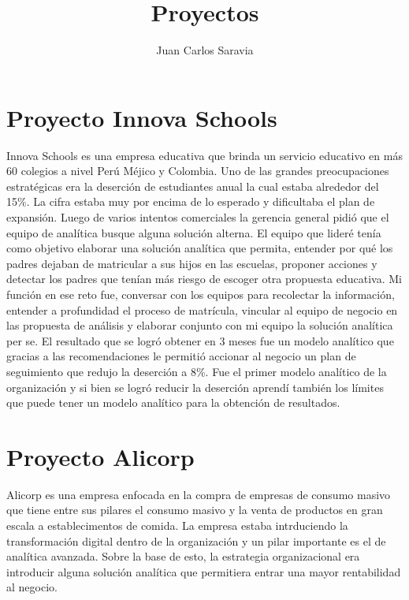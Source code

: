 \documentclass{article}
\date{}%
\begin{document}
\title{Proyectos} \author{Juan Carlos Saravia}

\maketitle

\section*{Proyecto Innova Schools}

Innova Schools es una empresa educativa que brinda un servicio educativo en más 60 colegios a nivel Perú Méjico y Colombia. Uno de las grandes preocupaciones estratégicas era la deserción de estudiantes anual la cual estaba alrededor del 15\%. La cifra estaba muy por encima de lo esperado y dificultaba el plan de expansión. Luego de varios intentos comerciales la gerencia general pidió que el equipo de analítica busque alguna solución alterna. El equipo que lideré tenía como objetivo elaborar una solución analítica que permita, entender por qué los padres dejaban de matricular a sus hijos en las escuelas, proponer acciones y detectar los padres que tenían más riesgo de escoger otra propuesta educativa. Mi función en ese reto fue, conversar con los equipos para recolectar la información, entender a profundidad el proceso de matrícula, vincular al equipo de negocio en las propuesta de análisis y elaborar conjunto con mi equipo la solución analítica per se. El resultado que se logró obtener en 3 meses fue un modelo analítico que gracias a las recomendaciones le permitió accionar al negocio un plan de seguimiento que redujo la deserción a 8\%. Fue el primer modelo analítico de la organización y si bien se logró reducir la deserción aprendí también los límites que puede tener un modelo analítico para la obtención de resultados. 


\section*{Proyecto Alicorp}

Alicorp es una empresa enfocada en la compra de empresas de consumo masivo que tiene entre sus pilares el consumo masivo y la venta de productos en gran escala a establecimentos de comida. La empresa estaba intrduciendo la transformación digital dentro de la organización y un pilar importante es el de analítica avanzada. Sobre la base de esto, la estrategia organizacional era introducir alguna solución analítica que permitiera entrar una mayor rentabilidad al negocio. 
\end{document}
